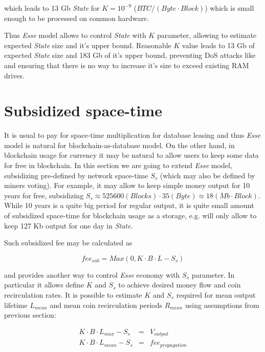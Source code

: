 \documentclass[]{article}   %
\newcommand{\esse}{\textit{Esse}}
\newcommand{\state}{\textit{State}}
\begin{document}
which leads to 13 Gb \state{} for $K=10^{-9}$ ($BTC / (Byte \cdot Block)$) which is small enough to be processed on common hardware.

Thus \esse{} model allows to control \state{} with $K$ parameter, allowing to estimate expected \state{} size and it's upper bound. Reasonable $K$ value leads to 13 Gb of expected \state{} size and 183 Gb of it's upper bound, preventing DoS attacks like \cite{bitcoin2015flood} and ensuring that there is no way to increase it's size to exceed existing RAM drives.

\section{Subsidized space-time}

It is usual to pay for space-time multiplication for database leasing and thus \esse{} model is natural for blockchain-as-database model. On the other hand, in blockchain usage for currency it may be natural to allow users to keep some data for free in blockchain. In this section we are going to extend \esse{} model, subsidizing pre-defined by network space-time $S_s$ (which may also be defined by miners voting). For example, it may allow to keep simple money output for 10 years for free, subsidizing $S_s \approx 525600 (Blocks) \cdot 35 (Byte) \approx 18 (Mb \cdot Block)$. While 10 years is a quite big period for regular output, it is quite small amount of subsidized space-time for blockchain usage as a storage, e.g. will only allow to keep 127 Kb output for one day in \state{}.

Such subsidized fee may be calculated as

\begin{equation}
fee_{sub} = Max(0, K \cdot B \cdot L - S_s)
\end{equation}

and provides another way to control \esse{} economy with $S_s$ parameter. In particular it allows define $K$ and $S_s$ to achieve desired money flow and coin recirculation rates. It is possible to estimate $K$ and $S_s$ required for mean output lifetime $L_{mean}$ and mean coin recirculation periods $R_{mean}$ using assumptions from previous section:

\begin{equation}
  \begin{array}{ccl}
   K \cdot B \cdot L_{max} - S_s & = & V_{output} \\
   K \cdot B \cdot L_{mean} - S_s & = & fee_{propagation}
  \end{array}
\end{equation}
\end{document}
